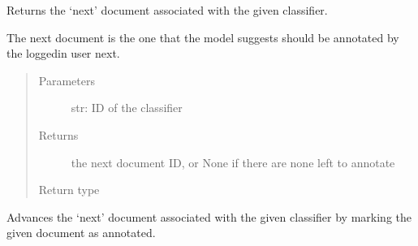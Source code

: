 \documentclass[letterpaper,10pt,english]{sphinxmanual}
\begin{document}
\begin{fulllineitems}

\begin{fulllineitems}
\label{\detokenize{autoapi/pine/client/index:pine.client.PineClient.get_next_document}}
\sphinxAtStartPar
Returns the ‘next’ document associated with the given classifier.

\sphinxAtStartPar
The next document is the one that the model suggests should be annotated by the logged\sphinxhyphen{}in
user next.
\begin{quote}\begin{description}
\item[{Parameters}] \leavevmode
\sphinxAtStartPar
{} \textendash{} str: ID of the classifier

\item[{Returns}] \leavevmode
\sphinxAtStartPar
the next document ID, or None if there are none left to annotate

\item[{Return type}] \leavevmode
\sphinxAtStartPar
{}

\end{description}\end{quote}

\end{fulllineitems}


\begin{fulllineitems}
\label{\detokenize{autoapi/pine/client/index:pine.client.PineClient.advance_next_document}}
\sphinxAtStartPar
Advances the ‘next’ document associated with the given classifier by marking the
given document as annotated.


\end{fulllineitems}
\end{fulllineitems}
\end{document}
